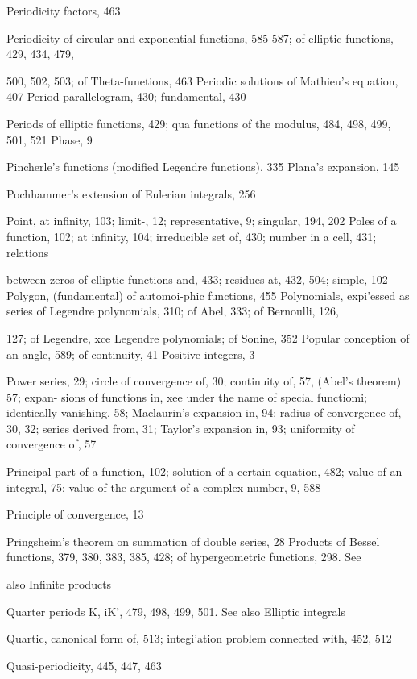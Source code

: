 %
%
Periodicity factors, 463

Periodicity of circular and exponential functions, 585-587; of elliptic functions, 429, 434, 479,

500, 502, 503; of Theta-funetions, 463
Periodic solutions of Mathieu's equation, 407
Period-parallelogram, 430; fundamental, 430

Periods of elliptic functions, 429; qua functions of the modulus, 484, 498, 499, 501, 521
Phase, 9

Pincherle's functions (modified Legendre functions), 335
Plana's expansion, 145

Pochhammer's extension of Eulerian integrals, 256

Point, at infinity, 103; limit-, 12; representative, 9; singular, 194, 202
Poles of a function, 102; at infinity, 104; irreducible set of, 430; number in a cell, 431; relations

between zeros of elliptic functions and, 433; residues at, 432, 504; simple, 102
Polygon, (fundamental) of automoi-phic functions, 455
Polynomials, expi'essed as series of Legendre polynomials, 310; of Abel, 333; of Bernoulli, 126,

127; of Legendre, xce Legendre polynomials; of Sonine, 352
Popular conception of an angle, 589; of continuity, 41
Positive integers, 3

Power series, 29; circle of convergence of, 30; continuity of, 57, (Abel's theorem) 57; expan-
sions of functions in, xee under the name  of special functiomi; identically vanishing, 58;
Maclaurin's expansion in, 94; radius of convergence of, 30, 32; series derived from, 31;
Taylor's expansion in, 93; uniformity of convergence of, 57

Principal part of a function, 102; solution of a certain equation,
482; value of an integral, 75;  value of the argument of a complex
number, 9, 588

Principle of convergence, 13

Pringsheim's theorem on summation of double series, 28
Products of Bessel functions, 379, 380, 383, 385, 428; of hypergeometric functions, 298. See

also Infinite products

Quarter periods K, iK', 479, 498, 499, 501. See also Elliptic integrals

Quartic, canonical form of, 513; integi'ation problem connected with, 452, 512

Quasi-periodicity, 445, 447, 463

